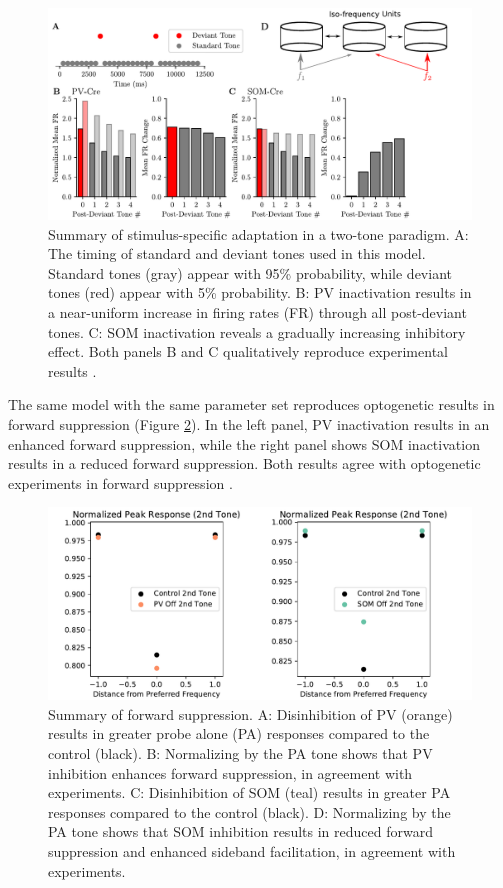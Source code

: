 \documentclass[a4paper,11pt]{article}
\begin{document}
\begin{figure}[ht!]
 \centering
 \includegraphics[width=\textwidth]{ssa.pdf}
 \caption{Summary of stimulus-specific adaptation in a two-tone paradigm. A: The timing of standard and deviant tones used in this model. Standard tones (gray) appear with 95\% probability, while deviant tones (red) appear with 5\% probability. B: PV inactivation results in a near-uniform increase in firing rates (FR) through all post-deviant tones. C: SOM inactivation reveals a gradually increasing inhibitory effect. Both panels B and C qualitatively reproduce experimental results \cite{natan2015complementary}.}\label{fig:ssa}
\end{figure}

The same model with the same parameter set reproduces optogenetic results in forward suppression (Figure \ref{fig:fs}). In the left panel, PV inactivation results in an enhanced forward suppression, while the right panel shows SOM inactivation results in a reduced forward suppression. Both results agree with optogenetic experiments in forward suppression \cite{phillips2017cortical}.

\begin{figure}[ht!]
 \centering
 \includegraphics[width=\textwidth]{fs.pdf}
 \caption{Summary of forward suppression. A: Disinhibition of PV (orange) results in greater probe alone (PA) responses compared to the control (black). B: Normalizing by the PA tone shows that PV inhibition enhances forward suppression, in agreement with experiments. C: Disinhibition of SOM (teal) results in greater PA responses compared to the control (black). D: Normalizing by the PA tone shows that SOM inhibition results in reduced forward suppression and enhanced sideband facilitation, in agreement with experiments.}\label{fig:fs}
\end{figure}
\end{document}
